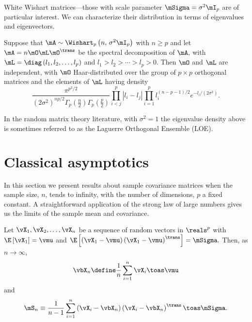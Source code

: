 White Wishart matrices---those with scale parameter $\mSigma = \sigma^2 \mI_p$
are of particular interest.  We can characterize their distribution in
terms of eigenvalues and eigenvectors.

\begin{proposition}
Suppose that
\(
    \mA
    \sim
    \Wishart_p \left(
        n, \,
        \sigma^2 \mI_p
    \right)
\)
with
\(
    n \geq p
\)
and let
\(
    \mA = n \mO \mL \mO^\trans
\)
be the spectral decomposition of
\(
    \mA,
\)
with
\(
    \mL
    =
    \diag \left(
        l_1,
        l_2,
        \ldots,
        l_p
    \right)
\)
and
\(
    l_1
    >
    l_2
    >
    \cdots
    >
    l_p
    >
    0.
\)
Then $\mO$ and $\mL$ are independent, with $\mO$ Haar-distributed over
the group of $p \times p$ orthogonal matrices and the elements of $\mL$
having density
\begin{equation}\label{E:wishart-eig-density}
    \frac{ \pi^{p^2/2} }
         { \left( 2 \sigma^2 \right)^{np/2}
           \Gamma_p \left( \frac{n}{2} \right) 
           \Gamma_p \left( \frac{p}{2} \right) }
    \prod_{i < j}^p
        \left| l_i - l_j \right|
    \prod_{i=1}^p
        l_i^{(n-p-1)/2}
        e^{-l_i/(2 \sigma^2)}.
\end{equation}    
\end{proposition}
\noindent
In the random matrix theory literature, with $\sigma^2 = 1$ the eigenvalue density above is sometimes referred to as the Laguerre Orthogonal Ensemble (LOE).

\section{Classical asymptotics}\label{S:multivariate-classical}

In this section we present results about sample covariance matrices when the sample size, $n$, tends to infinity, with the number of dimensions, $p$ a fixed constant.  A straightforward application of the strong law of large numbers gives us the limits of the sample mean and covariance.

\begin{proposition}\label{P:suff-stat-limits}
Let $\vX_1, \vX_2, \ldots, \vX_n$ be a sequence of \iid random vectors in $\reals^p$ with
\(
    \E \left[
        \vX_1
    \right]
    =
    \vmu
\)
and
\(
    \E \left[
        \left( \vX_1 - \vmu \right)
        \left( \vX_1 - \vmu \right)^\trans
    \right]
    =
    \mSigma.
\)
Then, as $n \to \infty$,
\[
    \vbX_n
    \define
    \frac{1}{n}
    \sum_{i=1}^n
        \vX_i
    \toas
    \vmu
\]
and
\[
    \mS_n
    \equiv
    \frac{1}{n-1}
    \sum_{i=1}^{n}
        \left( \vX_i - \vbX_n \right)
        \left( \vX_i - \vbX_n \right)^\trans
    \toas
    \mSigma.
\]
\end{proposition}

